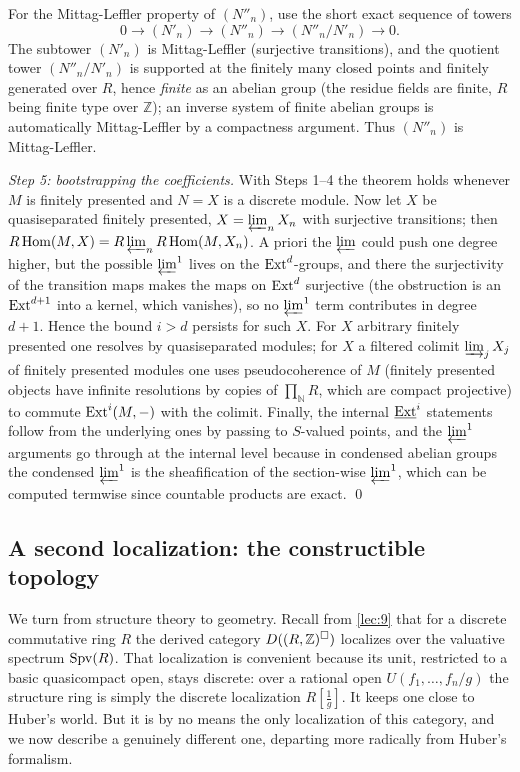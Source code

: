 For the Mittag-Leffler property of $(N''_{n})$, use the short exact sequence of
towers
\begin{equation*}
0\to (N'_{n})\to (N''_{n})\to (N''_{n}/N'_{n})\to 0.
\end{equation*}
The subtower $(N'_{n})$ is Mittag-Leffler (surjective transitions), and the
quotient tower $(N''_{n}/N'_{n})$ is supported at the finitely many closed
points and finitely generated over $R$, hence \emph{finite} as an abelian group
(the residue fields are finite, $R$ being finite type over $\mathbb{Z}$); an
inverse system of finite abelian groups is automatically Mittag-Leffler by a
compactness argument. Thus $(N''_{n})$ is Mittag-Leffler.

\emph{Step 5: bootstrapping the coefficients.} With Steps 1--4 the theorem holds
whenever $M$ is finitely presented and $N=X$ is a discrete module. Now let $X$
be quasiseparated finitely presented, $X=\varprojlim_{n}X_{n}$ with surjective
transitions; then $R\operatorname{Hom}(M,X)=R\varprojlim_{n}R\operatorname{Hom}(M,X_{n})$. A priori the
$\varprojlim$ could push one degree higher, but the possible $\varprojlim^{1}$
lives on the $\operatorname{Ext}^{d}$-groups, and there the surjectivity of the transition
maps makes the maps on $\operatorname{Ext}^{d}$ surjective (the obstruction is an
$\operatorname{Ext}^{d+1}$ into a kernel, which vanishes), so no $\varprojlim^{1}$ term
contributes in degree $d+1$. Hence the bound $i>d$ persists for such $X$. For
$X$ arbitrary finitely presented one resolves by quasiseparated modules; for
$X$ a filtered colimit $\varinjlim_{j}X_{j}$ of finitely presented modules one
uses pseudocoherence of $M$ (finitely presented objects have infinite
resolutions by copies of $\prod_{\mathbb{N}}R$, which are compact projective) to
commute $\operatorname{Ext}^{i}(M,-)$ with the colimit. Finally, the internal $\underline{\operatorname{Ext}}^{i}$
statements follow from the underlying ones by passing to $S$-valued points, and
the $\varprojlim^{1}$ arguments go through at the internal level because in
condensed abelian groups the condensed $\varprojlim^{1}$ is the sheafification
of the section-wise $\varprojlim^{1}$, which can be computed termwise since
countable products are exact. \qed

\subsection{A second localization: the constructible topology}

We turn from structure theory to geometry. Recall from \cref{lec:9} that for a
discrete commutative ring $R$ the derived category $D((R,\mathbb{Z})^{\square})$
localizes over the valuative spectrum $\operatorname{Spv}(R)$. That localization is convenient
because its unit, restricted to a basic quasicompact open, stays discrete: over
a rational open $U(f_{1},\dots,f_{n}/g)$ the structure ring is simply the
discrete localization $R[\tfrac1g]$. It keeps one close to Huber's world. But it
is by no means the only localization of this category, and we now describe a
genuinely different one, departing more radically from Huber's formalism.

